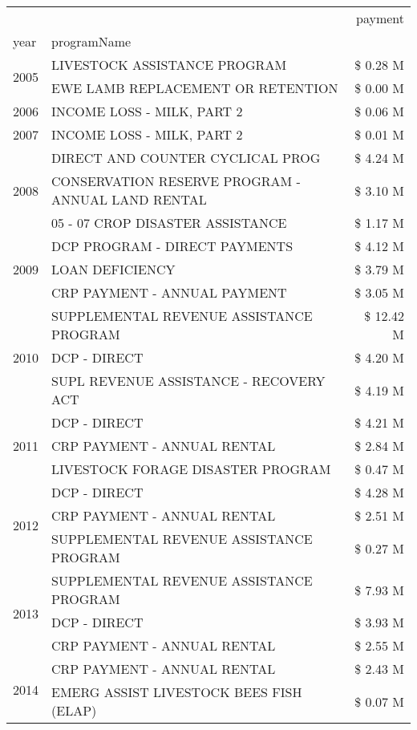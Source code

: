 \begin{tabular}{llr}
\toprule
 &  & payment \\
year & programName &  \\
\midrule
\multirow[t]{2}{*}{2005} & LIVESTOCK ASSISTANCE PROGRAM & \$ 0.28 M \\
 & EWE LAMB REPLACEMENT OR RETENTION & \$ 0.00 M \\
\cline{1-3}
2006 & INCOME LOSS - MILK, PART 2 & \$ 0.06 M \\
\cline{1-3}
2007 & INCOME LOSS - MILK, PART 2 & \$ 0.01 M \\
\cline{1-3}
\multirow[t]{3}{*}{2008} & DIRECT AND COUNTER CYCLICAL PROG & \$ 4.24 M \\
 & CONSERVATION RESERVE PROGRAM - ANNUAL LAND RENTAL & \$ 3.10 M \\
 & 05 - 07 CROP DISASTER ASSISTANCE & \$ 1.17 M \\
\cline{1-3}
\multirow[t]{3}{*}{2009} & DCP PROGRAM - DIRECT PAYMENTS & \$ 4.12 M \\
 & LOAN DEFICIENCY & \$ 3.79 M \\
 & CRP PAYMENT - ANNUAL PAYMENT & \$ 3.05 M \\
\cline{1-3}
\multirow[t]{3}{*}{2010} & SUPPLEMENTAL REVENUE ASSISTANCE PROGRAM & \$ 12.42 M \\
 & DCP - DIRECT & \$ 4.20 M \\
 & SUPL REVENUE ASSISTANCE - RECOVERY ACT & \$ 4.19 M \\
\cline{1-3}
\multirow[t]{3}{*}{2011} & DCP - DIRECT & \$ 4.21 M \\
 & CRP PAYMENT - ANNUAL RENTAL & \$ 2.84 M \\
 & LIVESTOCK FORAGE DISASTER PROGRAM & \$ 0.47 M \\
\cline{1-3}
\multirow[t]{3}{*}{2012} & DCP - DIRECT & \$ 4.28 M \\
 & CRP PAYMENT - ANNUAL RENTAL & \$ 2.51 M \\
 & SUPPLEMENTAL REVENUE ASSISTANCE PROGRAM & \$ 0.27 M \\
\cline{1-3}
\multirow[t]{3}{*}{2013} & SUPPLEMENTAL REVENUE ASSISTANCE PROGRAM & \$ 7.93 M \\
 & DCP - DIRECT & \$ 3.93 M \\
 & CRP PAYMENT - ANNUAL RENTAL & \$ 2.55 M \\
\cline{1-3}
\multirow[t]{3}{*}{2014} & CRP PAYMENT - ANNUAL RENTAL & \$ 2.43 M \\
 & EMERG ASSIST LIVESTOCK BEES FISH (ELAP) & \$ 0.07 M \\

\end{tabular}

